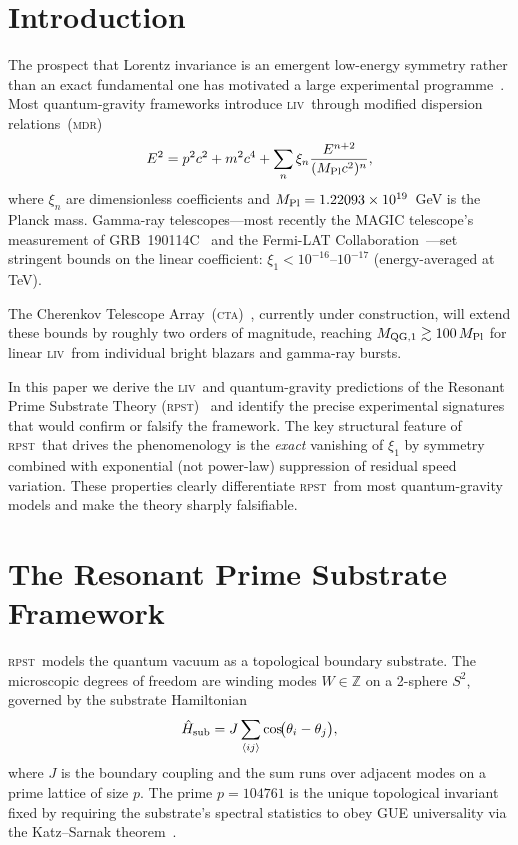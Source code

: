 \documentclass[aps,prd,twocolumn,showpacs,preprintnumbers]{revtex4-2}
\newcommand{\rpst}{\textsc{rpst}}
\newcommand{\Mpl}{M_{\rm Pl}}
\newcommand{\CTA}{\textsc{cta}}
\newcommand{\MDR}{\textsc{mdr}}
\newcommand{\LIV}{\textsc{liv}}
\begin{document}
\section{Introduction}
\label{sec:intro}

The prospect that Lorentz invariance is an emergent low-energy symmetry
rather than an exact fundamental one has motivated a large experimental
programme~\cite{Mattingly2005,Liberati2013}.  Most quantum-gravity frameworks
introduce \LIV\ through modified dispersion relations~(\MDR)
\begin{equation}
  E^2 = p^2 c^2 + m^2 c^4
        + \sum_n \xi_n \frac{E^{n+2}}{(\Mpl c^2)^n},
\label{eq:mdr}
\end{equation}
where $\xi_n$ are dimensionless coefficients and $\Mpl = 1.22093\times
10^{19}$~GeV is the Planck mass.  Gamma-ray telescopes—most recently the MAGIC
telescope's measurement of GRB~190114C~\cite{MAGIC2020} and the Fermi-LAT
Collaboration~\cite{FermiLAT2009}—set stringent bounds on the linear
coefficient:
$\xi_1 < 10^{-16}$--$10^{-17}$ (energy-averaged at TeV).

The Cherenkov Telescope Array~(\CTA)~\cite{CTA2019}, currently under
construction, will extend these bounds by roughly two orders of magnitude,
reaching $M_{\rm QG,1} \gtrsim 100\,\Mpl$ for linear \LIV\ from individual
bright blazars and gamma-ray bursts.

In this paper we derive the \LIV\ and quantum-gravity predictions of the
Resonant Prime Substrate Theory
(\rpst)~\cite{AlKahwati2026a,AlKahwati2026b} and identify the precise
experimental signatures that would confirm or falsify the framework.  The key
structural feature of \rpst\ that drives the phenomenology is the
\textit{exact} vanishing of $\xi_1$ by symmetry combined with exponential (not
power-law) suppression of residual speed variation.  These properties clearly
differentiate \rpst\ from most quantum-gravity models and make the theory
sharply falsifiable.

\section{The Resonant Prime Substrate Framework}
\label{sec:rpst}

\rpst\ models the quantum vacuum as a topological boundary substrate.  The
microscopic degrees of freedom are winding modes $W \in \mathbb{Z}$ on a
2-sphere $S^2$, governed by the substrate Hamiltonian
\begin{equation}
  \hat{H}_{\rm sub}
    = J \sum_{\langle ij \rangle} \cos\!\bigl(\theta_i - \theta_j\bigr),
\end{equation}
where $J$ is the boundary coupling and the sum runs over adjacent modes on a
prime lattice of size $p$.  The prime $p = 104761$ is the unique topological
invariant fixed by requiring the substrate's spectral statistics to obey GUE
universality via the Katz--Sarnak theorem~\cite{KatzSarnak1999}.
\end{document}
